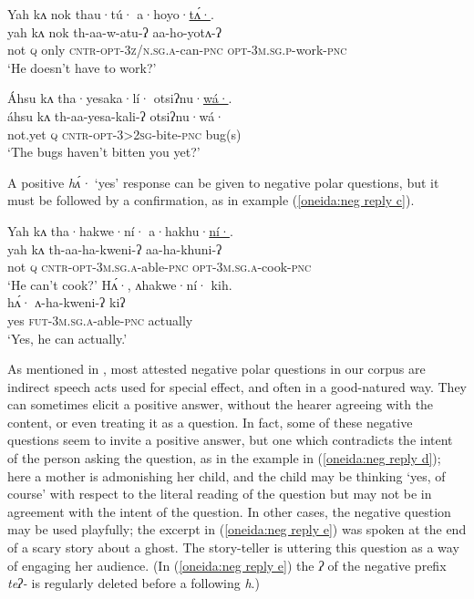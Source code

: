 \documentclass[output=paper,colorlinks,citecolor=brown]{langscibook}
\begin{document}
\ea\label{oneida:neg reply a} 
    \glll Yah kʌ nok thau·tú· a·hoyo·\uline{tʌ́·}.\\
    yah kʌ nok th-aa-w-atu-ʔ aa-ho-yotʌ-ʔ\\
    not \textsc{q} only \textsc{cntr-opt-3z/n.sg.a}-can-\textsc{pnc} \textsc{opt-3m.sg.p}-work-\textsc{pnc} \\
    \glt `He doesn't have to work?' 
\z

\ea\label{oneida:neg reply b} 
    \glll Áhsu kʌ tha·yesaka·lí· otsiʔnu·\uline{wá·}. \\
    áhsu kʌ th-aa-yesa-kali-{ʔ} otsiʔnu·wá· \\
    {not.yet} \textsc{q} \textsc{cntr-opt-3>2sg}-bite-\textsc{pnc} bug(s) \\
    \glt `The bugs haven't bitten you yet?'
\z

A positive \textit{hʌ́·} `yes' response can be given to negative polar questions, but it must be followed by a confirmation, as in example (\ref{oneida:neg reply c}).

\ea\label{oneida:neg reply c} 
    \begin{xlist}[B: ]
     \glll Yah kʌ tha·hakwe·ní· a·hakhu·\uline{ní·}. \\
    yah kʌ th-aa-ha-kweni-ʔ aa-ha-khuni-ʔ \\
    not \textsc{q} \textsc{cntr-opt-3m.sg.a}-able-\textsc{pnc} \textsc{opt-3m.sg.a}-cook-\textsc{pnc} \\
    \glt `He can't cook?'
     \glll  Hʌ́·, ʌhakwe·ní· kih. \\
    hʌ́· ʌ-ha-kweni-ʔ kiʔ \\
     yes  \textsc{fut-3m.sg.a}-able-\textsc{pnc} actually \\
    \glt `Yes, he can actually.' 
    \end{xlist}
\z

As mentioned in , most attested negative polar questions in our corpus are indirect speech acts used for special effect, and often in a good-natured way. They can sometimes elicit a positive answer, without the hearer agreeing with the content, or even treating it as a question. In fact, some of these negative questions seem to invite a positive answer, but one which contradicts the intent of the person asking the question, as in the example in (\ref{oneida:neg reply d}); here a mother is admonishing her child, and the child may be thinking `yes, of course' with respect to the literal reading of the question but may not be in agreement with the intent of the question. In other cases, the negative question may be used playfully; the excerpt in (\ref{oneida:neg reply e}) was spoken at the end of a scary story about a ghost. The story-teller is uttering this question as a way of engaging her audience. (In (\ref{oneida:neg reply e}) the \textit{ʔ} of the negative prefix \textit{teʔ-} is regularly deleted before a following \textit{h}.)
\end{document}
